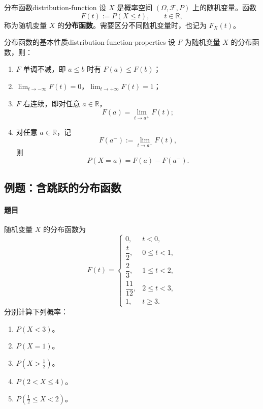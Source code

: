 \begin{mydefinition}{分布函数}{distribution-function}
设 $X$ 是概率空间 $(\Omega,\mathscr F,P)$ 上的随机变量。函数
\[
F(t):=P(X\leq t),\qquad t\in\mathbb R,
\]
称为随机变量 $X$ 的\textbf{分布函数}。需要区分不同随机变量时，也记为 $F_X(t)$。
\end{mydefinition}

\begin{mytheorem}{分布函数的基本性质}{distribution-function-properties}
设 $F$ 为随机变量 $X$ 的分布函数，则：
\begin{enumerate}
    \item $F$ 单调不减，即 $a\leq b$ 时有 $F(a)\leq F(b)$；
    \item $\displaystyle\lim_{t\to-\infty}F(t)=0$，$\displaystyle\lim_{t\to+\infty}F(t)=1$；
    \item $F$ 右连续，即对任意 $a\in\mathbb R$，
    \[
    F(a)=\lim_{t\to a^+}F(t);
    \]
    \item 对任意 $a\in\mathbb R$，记
    \[
    F(a^-):=\lim_{t\to a^-}F(t),
    \]
    则
    \[
    P(X=a)=F(a)-F(a^-).
    \]
\end{enumerate}
\end{mytheorem}

\subsection{例题：含跳跃的分布函数}\label{note:c2:e2}
\paragraph{题目}
随机变量 $X$ 的分布函数为
\[
F(t)=
\begin{cases}
0,&t<0,\\[0.3em]
\dfrac t2,&0\leq t<1,\\[0.5em]
\dfrac23,&1\leq t<2,\\[0.5em]
\dfrac{11}{12},&2\leq t<3,\\[0.5em]
1,&t\geq3.
\end{cases}
\]
分别计算下列概率：
\begin{enumerate}
\item $P(X<3)$。
\item $P(X=1)$。
\item $P(X>\frac12)$。
\item $P(2<X\leq4)$。
\item $P(\frac12\leq X<2)$。
\end{enumerate}

